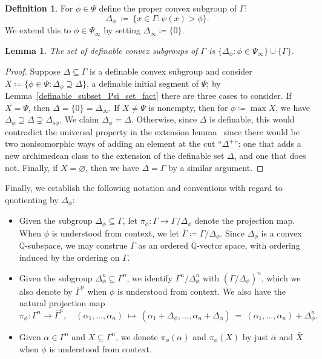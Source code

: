 \documentclass[11pt]{amsart}
\theoremstyle{plain}
\newtheorem{lemma}[thm]{Lemma}
\theoremstyle{definition}
\newtheorem{definition}[thm]{Definition}
\numberwithin{equation}{section}
\newcommand\Q{\mathbb{Q}}
\newcommand\0{\varnothing}
\begin{document}
\begin{definition}
For $\phi\in\Psi$ define the proper convex subgroup of $\Gamma$:
\[
\Delta_{\phi} \ \coloneqq \ \{x\in\Gamma:\psi(x)>\phi\}.
\]
We extend this to $\phi\in\Psi_{\infty}$ by setting $\Delta_{\infty}\coloneqq\{0\}$.
\end{definition}


\begin{lemma}\label{lem_char_def_convex_subgroups}
The set of definable convex subgroups of $\Gamma$ is $\{\Delta_{\phi}:\phi\in\Psi_{\infty}\}\cup\{\Gamma\}$.
\end{lemma}
\begin{proof}
Suppose $\Delta\subseteq\Gamma$ is a definable convex subgroup and consider $X\coloneqq\{\phi\in\Psi:\Delta_{\phi}\supseteq\Delta\}$, a definable initial segment of $\Psi$; by Lemma~\ref{definable_subset_Psi_set_fact} there are three cases to consider. If $X=\Psi$, then $\Delta=\{0\}=\Delta_{\infty}$. 
If $X\neq\Psi$ is nonempty, then for $\phi\coloneqq\max X$, we have $\Delta_{\phi}\supseteq \Delta\supsetneq\Delta_{s\phi}$. We claim $\Delta_{\phi}=\Delta$. Otherwise, since $\Delta$ is definable, this would contradict the universal property in the extension lemma~\cite[4.6]{GehretACTlog} since there would be two nonisomorphic ways of adding an element at the cut ``$\Delta^+$'': one that adds a new archimedean class to the extension of the definable set $\Delta$, and one that does not.
Finally, if $X=\varnothing$, then we have $\Delta=\Gamma$ by a similar argument.
\end{proof}

\noindent
Finally, we establish the following notation and conventions with regard to quotienting by $\Delta_{\phi}$:

\begin{itemize}
\item Given the subgroup $\Delta_{\phi}\subseteq\Gamma$, let $\pi_{\phi}\colon\Gamma\to\Gamma/\Delta_{\phi}$ denote the projection map. When $\phi$ is understood from context, we let $\bar{\Gamma}\coloneqq\Gamma/\Delta_{\phi}$. Since $\Delta_{\phi}$ is a convex $\Q$-subspace, we may construe $\bar{\Gamma}$ as an ordered $\Q$-vector space, with ordering induced by the ordering on $\Gamma$.
\item Given the subgroup $\Delta_{\phi}^n\subseteq\Gamma^n$, we identify $\Gamma^n/\Delta^n_{\phi}$ with $(\Gamma/\Delta_{\phi})^n$, which we also denote by $\bar{\Gamma}^n$ when $\phi$ is understood from context. We also have the natural projection map
\[
\pi_{\phi} \colon \Gamma^n\to\bar{\Gamma}^n,\quad (\alpha_1,\ldots,\alpha_n) \ \mapsto \ (\alpha_1+\Delta_{\phi},\ldots,\alpha_n+\Delta_{\phi}) \ = \ (\alpha_1,\ldots,\alpha_n)+\Delta_{\phi}^n.
\]
\item Given $\alpha\in\Gamma^n$ and $X\subseteq\Gamma^n$, we denote $\pi_{\phi}(\alpha)$ and $\pi_{\phi}(X)$ by just $\bar{\alpha}$ and $\bar{X}$ when $\phi$ is understood from context.
\end{itemize}
\end{document}
